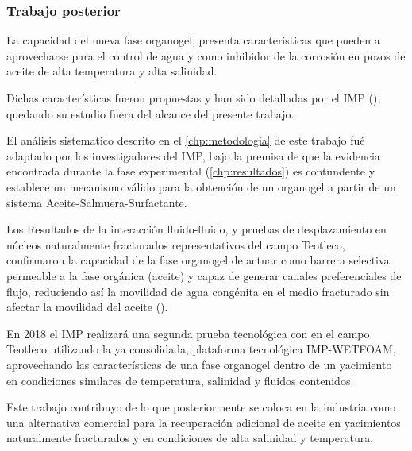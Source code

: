 \subsubsection{Trabajo posterior}
La capacidad del nueva fase organogel, presenta características que pueden a aprovecharse para el control de agua y como inhibidor de la corrosión en pozos de aceite de alta temperatura y alta salinidad. 

 Dichas características fueron propuestas y han sido detalladas por el IMP (\cite{WETFOAM}), quedando su estudio fuera del alcance del presente trabajo.

El análisis sistematico descrito en el \autoref{chp:metodologia} de este trabajo fué adaptado por los investigadores del IMP, bajo la premisa de que la evidencia encontrada durante la fase experimental (\autoref{chp:resultados}) es contundente y establece un mecanismo válido para la obtención de un organogel a partir de un sistema Aceite-Salmuera-Surfactante.

Los Resultados de la interacción fluido-fluido, y pruebas de desplazamiento en núcleos naturalmente fracturados representativos del campo Teotleco, confirmaron la capacidad de la fase organogel de actuar como barrera selectiva permeable a la fase orgánica (aceite) y capaz de generar canales preferenciales de flujo, reduciendo así la movilidad de agua congénita en el medio fracturado sin afectar la movilidad del aceite (\cite{Elizabeth}).

En 2018 el IMP realizará una segunda prueba tecnológica con en el campo Teotleco utilizando la ya consolidada, plataforma tecnológica IMP-WETFOAM, aprovechando las características de una fase organogel dentro de un yacimiento en condiciones similares de temperatura, salinidad y fluidos contenidos.

Este trabajo contribuyo de lo que posteriormente se coloca en la industria como una alternativa comercial para la recuperación adicional de aceite en yacimientos naturalmente fracturados y en condiciones de alta salinidad y temperatura.